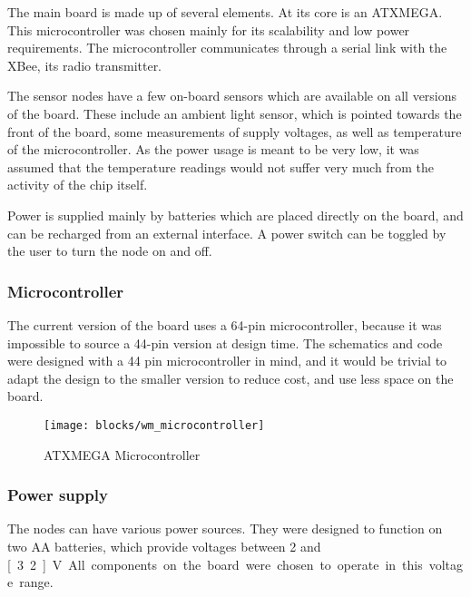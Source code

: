 The main board is made up of several elements. At its core is an ATXMEGA. This
microcontroller was chosen mainly for its scalability and low power
requirements. The microcontroller communicates through a serial link with the
XBee, its radio transmitter.

The sensor nodes have a few on-board sensors which are available on all versions
of the board. These include an ambient light sensor, which is pointed towards
the front of the board, some measurements of supply voltages, as well as
temperature of the microcontroller. As the power usage is meant to be very low,
it was assumed that the temperature readings would not suffer very much from
the activity of the chip itself.

Power is supplied mainly by batteries which are placed directly on the board,
and can be recharged from an external interface. A power switch can be toggled
by the user to turn the node on and off.

\subsubsection{Microcontroller}

The current version of the board uses a 64-pin microcontroller, because it
was impossible to source a 44-pin version at design time. The schematics and
code were designed with a 44 pin microcontroller in mind, and it would be
trivial to adapt the design to the smaller version to reduce cost, and use less
space on the board.

\begin{figure}[htpb]
  \begin{center}
    \texttt{[image: blocks/wm\_microcontroller]}
  \end{center}
  \caption{ATXMEGA Microcontroller}
  \label{fig:microcontroller}
\end{figure}


\subsubsection{Power supply}

The nodes can have various power sources. They were designed to function on two
AA batteries, which provide voltages between 2 and \unit[3.2]{V}. All components on
the board were chosen to operate in this voltage range.

